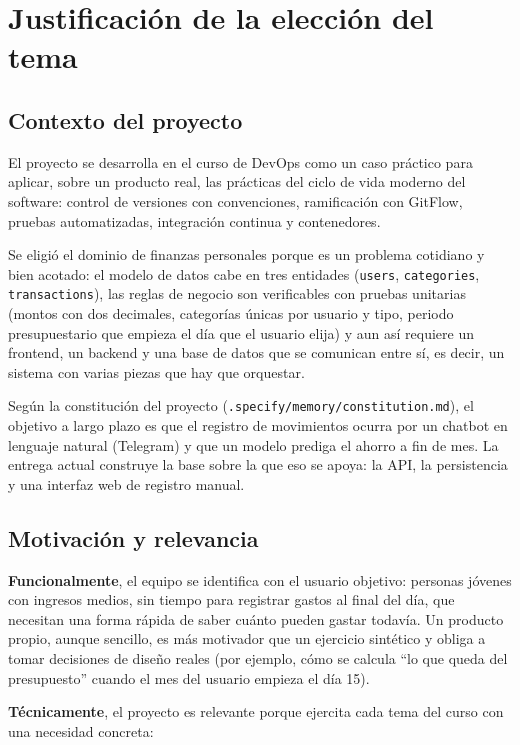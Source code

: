 \section{Justificación de la elección del tema}

\subsection{Contexto del proyecto}
El proyecto se desarrolla en el curso de DevOps como un caso práctico para aplicar, sobre un producto real, las prácticas del ciclo de vida moderno del software: control de versiones con convenciones, ramificación con GitFlow, pruebas automatizadas, integración continua y contenedores.

Se eligió el dominio de finanzas personales porque es un problema cotidiano y bien acotado: el modelo de datos cabe en tres entidades (\texttt{users}, \texttt{categories}, \texttt{transactions}), las reglas de negocio son verificables con pruebas unitarias (montos con dos decimales, categorías únicas por usuario y tipo, periodo presupuestario que empieza el día que el usuario elija) y aun así requiere un frontend, un backend y una base de datos que se comunican entre sí, es decir, un sistema con varias piezas que hay que orquestar.

Según la constitución del proyecto (\texttt{.specify/memory/constitution.md}), el objetivo a largo plazo es que el registro de movimientos ocurra por un chatbot en lenguaje natural (Telegram) y que un modelo prediga el ahorro a fin de mes. La entrega actual construye la base sobre la que eso se apoya: la API, la persistencia y una interfaz web de registro manual.

\subsection{Motivación y relevancia}
\textbf{Funcionalmente}, el equipo se identifica con el usuario objetivo: personas jóvenes con ingresos medios, sin tiempo para registrar gastos al final del día, que necesitan una forma rápida de saber cuánto pueden gastar todavía. Un producto propio, aunque sencillo, es más motivador que un ejercicio sintético y obliga a tomar decisiones de diseño reales (por ejemplo, cómo se calcula ``lo que queda del presupuesto'' cuando el mes del usuario empieza el día 15).

\textbf{Técnicamente}, el proyecto es relevante porque ejercita cada tema del curso con una necesidad concreta:

